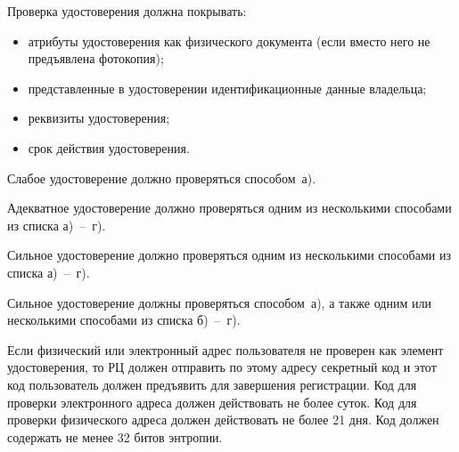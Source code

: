 

Проверка удостоверения должна покрывать:
\begin{itemize}
\item
атрибуты удостоверения как физического документа 
(если вместо него не предъявлена фотокопия);
\item
представленные в удостоверении идентификационные данные владельца;
\item
реквизиты удостоверения;
\item
срок действия удостоверения.
\end{itemize}


Слабое удостоверение должно проверяться способом~а).


Адекватное удостоверение должно проверяться одним из несколькими способами 
из списка а)~--~г).


Сильное удостоверение должно проверяться одним из несколькими способами 
из списка а)~--~г).

Сильное удостоверение должны проверяться способом~а), 
а также одним или несколькими способами из списка б)~--~г).



Если физический или электронный адрес пользователя не проверен
как элемент удостоверения, то РЦ должен отправить по этому 
адресу секретный код и этот код пользователь должен предъявить 
для завершения регистрации. 
%
Код для проверки электронного адреса должен действовать не более суток.
%
Код для проверки физического адреса должен действовать не более 21 дня.
%
Код должен содержать не менее 32 битов энтропии.

